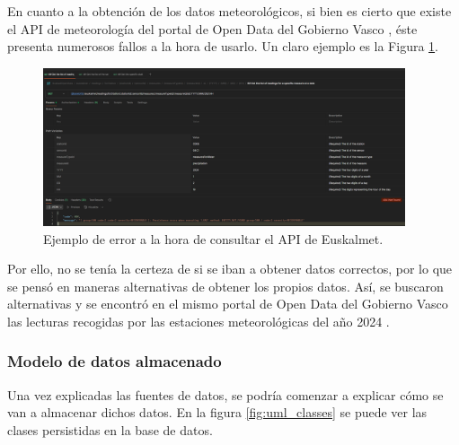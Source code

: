 En cuanto a la obtención de los datos meteorológicos, si bien es cierto que existe el API de meteorología del portal de Open Data del Gobierno Vasco \cite{apiMeteo}, éste presenta numerosos fallos a la hora de usarlo. Un claro ejemplo es la Figura \ref{fig:euskalmet_api_error}. 

\begin{figure}[H]
	\centering
	\includegraphics[width=0.95\textwidth]{includes/error_api_euskalmet.png}
	\caption{Ejemplo de error a la hora de consultar el API de Euskalmet.}
	\label{fig:euskalmet_api_error}
\end{figure}

Por ello, no se tenía la certeza de si se iban a obtener datos correctos, por lo que se pensó en maneras alternativas de obtener los propios datos. Así, se buscaron alternativas y se encontró en el mismo portal de Open Data del Gobierno Vasco las lecturas recogidas por las estaciones meteorológicas del año 2024 \cite{xmlMeteo2024}. 

\subsubsection{Modelo de datos almacenado}

Una vez explicadas las fuentes de datos, se podría comenzar a explicar cómo se van a almacenar dichos datos. En la figura \ref{fig:uml_classes} se puede ver las clases persistidas en la base de datos.

